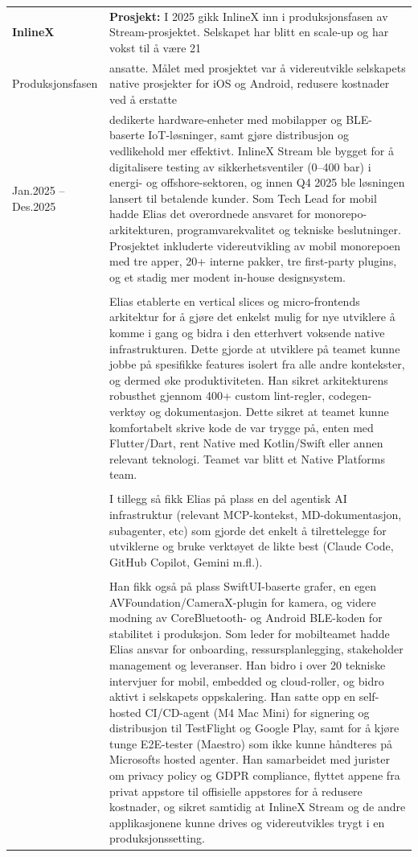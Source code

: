 \documentclass[a4paper,10pt]{article}
\begin{document}
\noindent
\begin{longtable}{@{}p{4cm}p{11cm}@{}}  
\textbf{InlineX} 
& \textbf{Prosjekt:} I 2025 gikk InlineX inn i produksjonsfasen av Stream-prosjektet. Selskapet har blitt en scale-up og  har vokst til å være 21 \\
Produksjonsfasen &  ansatte. Målet med prosjektet var å videreutvikle selskapets native prosjekter for iOS og Android, redusere kostnader ved å erstatte \\
Jan.2025 -- Des.2025 &  dedikerte hardware-enheter med mobilapper og BLE-baserte IoT-løsninger, samt gjøre distribusjon og vedlikehold mer effektivt. InlineX Stream ble bygget for å digitalisere testing av sikkerhetsventiler (0–400 bar) i energi- og offshore-sektoren, og innen Q4 2025 ble løsningen lansert til betalende kunder. Som Tech Lead for mobil hadde Elias det overordnede ansvaret for monorepo-arkitekturen, programvarekvalitet og tekniske beslutninger. Prosjektet inkluderte videreutvikling av mobil monorepoen med tre apper, 20+ interne pakker, tre first-party plugins, og et stadig mer modent in-house designsystem. \\
& \\
& Elias etablerte en vertical slices og  micro-frontends arkitektur for å gjøre det enkelst mulig for nye utviklere å komme i gang og bidra i den etterhvert voksende native infrastrukturen. Dette gjorde at utviklere på teamet kunne jobbe på spesifikke features isolert fra alle andre kontekster, og dermed øke produktiviteten. Han sikret arkitekturens robusthet gjennom 400+ custom lint-regler, codegen-verktøy og dokumentasjon. Dette sikret at teamet kunne komfortabelt skrive kode de var trygge på, enten med Flutter/Dart, rent Native med Kotlin/Swift eller annen relevant teknologi. Teamet var blitt et Native Platforms team. \\
& \\
& I tillegg så fikk Elias på plass en del agentisk AI infrastruktur (relevant MCP-kontekst, MD-dokumentasjon, subagenter, etc) som gjorde det enkelt å tilrettelegge for utviklerne og bruke verktøyet de likte best (Claude Code, GitHub Copilot, Gemini m.fl.).  \\
& \\
& Han fikk også på plass SwiftUI-baserte grafer, en egen AVFoundation/CameraX-plugin for kamera, og videre modning av CoreBluetooth- og Android BLE-koden for stabilitet i produksjon. Som leder for mobilteamet hadde Elias ansvar for onboarding, ressursplanlegging, stakeholder management og leveranser. Han bidro i over 20 tekniske intervjuer for mobil, embedded og cloud-roller, og bidro aktivt i selskapets oppskalering. Han satte opp en self-hosted CI/CD-agent (M4 Mac Mini) for signering og distribusjon til TestFlight og Google Play, samt for å kjøre tunge E2E-tester (Maestro) som ikke kunne håndteres på Microsofts hosted agenter. Han samarbeidet med jurister om privacy policy og GDPR compliance, flyttet appene fra privat appstore til offisielle appstores for å redusere kostnader, og sikret samtidig at InlineX Stream og de andre applikasjonene kunne drives og videreutvikles trygt i en produksjonssetting. \\

\end{longtable}
\end{document}
